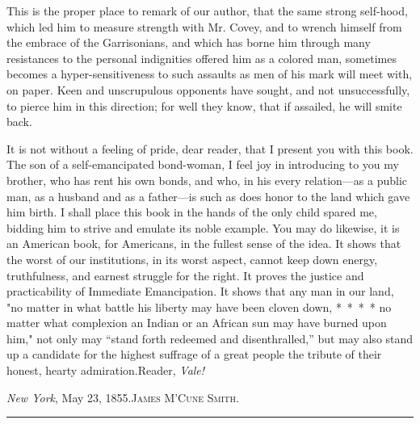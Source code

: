 This is the proper place to remark of our author, that the same strong
self-hood, which led him to measure strength with Mr. Covey, and to
wrench himself from the embrace of the Garrisonians, and which has borne
him through many resistances to the personal indignities offered him as
a colored man, sometimes becomes a hyper-sensitiveness to such assaults
as men of his mark will meet with, on paper. Keen and unscrupulous
opponents have sought, and not unsuccessfully, to pierce him in this
direction; for well they know, that if assailed, he will smite back.

It is not without a feeling of pride, dear reader, that I present you
with this book. The son of a self-emancipated bond-woman, I feel joy in
introducing to you my brother, who has rent his own bonds, and who, in
his every relation---as a public man, as a husband and as a father---is
such as does honor to the land which gave him birth. I shall place this
book in the hands of the only child spared me, bidding him to strive and
emulate its noble example. You may do likewise, it is an American book,
for Americans, in the fullest sense of the idea. It shows that the worst
of our institutions, in its worst aspect, cannot keep down energy,
truthfulness, and earnest struggle for the right. It proves the justice
and practicability of Immediate Emancipation. It shows that any man in
our land, "no matter in what battle his liberty may have been cloven
down, {*~*~*~*} no matter what complexion an Indian or an African sun
may have burned upon him," not only may ``stand forth redeemed and
disenthralled,'' but may also stand up a candidate for the highest
suffrage of a great people the tribute of their honest, hearty
admiration.{﻿}Reader, \emph{Vale!}

{﻿}\emph{New York}, May 23, 1855.{\textsc{James M'Cune Smith.}}

\begin{center}\rule{0.5\linewidth}{\linethickness}\end{center}

